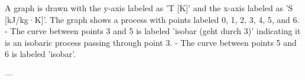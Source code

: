 A graph is drawn with the y-axis labeled as 'T [K]' and the x-axis labeled as 'S [kJ/kg·K]'. The graph shows a process with points labeled 0, 1, 2, 3, 4, 5, and 6.  
- The curve between points 3 and 5 is labeled 'isobar (geht durch 3)' indicating it is an isobaric process passing through point 3.  
- The curve between points 5 and 6 is labeled 'isobar'.  

---